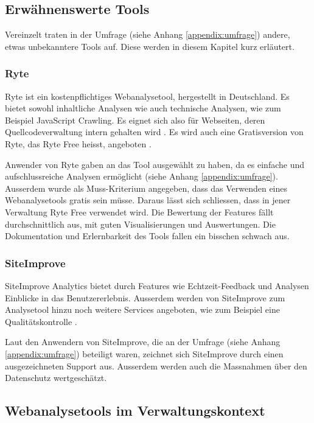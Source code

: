 \subsection{Erwähnenswerte Tools}

Vereinzelt traten in der Umfrage (siehe Anhang \ref{appendix:umfrage}) andere, etwas unbekanntere Tools auf. Diese werden in diesem Kapitel kurz erläutert. 

\subsubsection{Ryte}

Ryte ist ein kostenpflichtiges Webanalysetool, hergestellt in Deutschland. Es bietet sowohl inhaltliche Analysen wie auch technische Analysen, wie zum Beispiel JavaScript Crawling. Es eignet sich also für Webseiten, deren Quellcodeverwaltung intern gehalten wird \parencite{RyteFeatures}. Es wird auch eine Gratisversion von Ryte, das Ryte Free heisst, angeboten \parencite{RyteFree}.

Anwender von Ryte gaben an das Tool ausgewählt zu haben, da es einfache und aufschlussreiche Analysen ermöglicht (siehe Anhang \ref{appendix:umfrage}). Ausserdem wurde als Muss-Kriterium angegeben, dass das Verwenden eines Webanalysetools gratis sein müsse. Daraus lässt sich schliessen, dass in jener Verwaltung Ryte Free verwendet wird. Die Bewertung der Features fällt durchschnittlich aus, mit guten Visualisierungen und Auswertungen. Die Dokumentation und Erlernbarkeit des Tools fallen ein bisschen schwach aus. 

\subsubsection{SiteImprove}

SiteImprove Analytics bietet durch Features wie Echtzeit-Feedback und Analysen Einblicke in das Benutzererlebnis. Ausserdem werden von SiteImprove zum Analysetool hinzu noch weitere Services angeboten, wie zum Beispiel eine Qualitätskontrolle \parencite{SiteimproveFeatures}.

Laut den Anwendern von SiteImprove, die an der Umfrage (siehe Anhang \ref{appendix:umfrage}) beteiligt waren, zeichnet sich SiteImprove durch einen ausgezeichneten Support aus. Ausserdem werden auch die Massnahmen über den Datenschutz wertgeschätzt.


\subsection{Webanalysetools im Verwaltungskontext}

